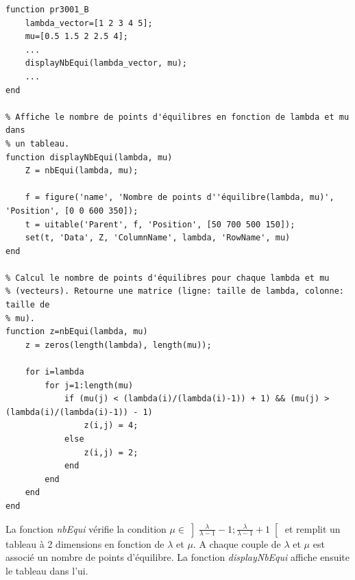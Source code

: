 \documentclass[11pt]{article}
\begin{document}
\begin{lstlisting}
function pr3001_B
	lambda_vector=[1 2 3 4 5];
	mu=[0.5 1.5 2 2.5 4];
	...
	displayNbEqui(lambda_vector, mu);
	...
end

% Affiche le nombre de points d'équilibres en fonction de lambda et mu dans
% un tableau.
function displayNbEqui(lambda, mu)
    Z = nbEqui(lambda, mu);
    
    f = figure('name', 'Nombre de points d''équilibre(lambda, mu)', 'Position', [0 0 600 350]);
    t = uitable('Parent', f, 'Position', [50 700 500 150]);
    set(t, 'Data', Z, 'ColumnName', lambda, 'RowName', mu)
end

% Calcul le nombre de points d'équilibres pour chaque lambda et mu
% (vecteurs). Retourne une matrice (ligne: taille de lambda, colonne: taille de 
% mu).
function z=nbEqui(lambda, mu)
    z = zeros(length(lambda), length(mu));
    
    for i=lambda
        for j=1:length(mu)
            if (mu(j) < (lambda(i)/(lambda(i)-1)) + 1) && (mu(j) > (lambda(i)/(lambda(i)-1)) - 1)
                z(i,j) = 4;
            else
                z(i,j) = 2;
            end
        end
    end
end
\end{lstlisting}
La fonction \emph{nbEqui} vérifie la condition $\displaystyle \mu \in \left] \frac{\lambda}{\lambda - 1}-1 ; \frac{\lambda}{\lambda - 1}+1 \right[$ et remplit un tableau à 2 dimensions en fonction de $\lambda$ et $\mu$. A chaque couple de $\lambda$ et $\mu$ est associé un nombre de points d'équilibre. La fonction \emph{displayNbEqui} affiche ensuite le tableau dans l'ui.


\newpage
\end{document}
